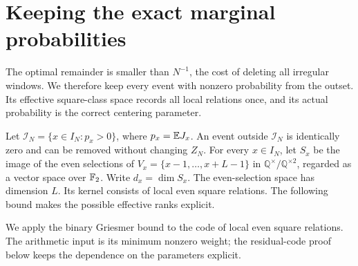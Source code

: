 \section{Keeping the exact marginal probabilities}
\label{p13:exact:section}

The optimal remainder is smaller than \(N^{-1}\), the cost of deleting
all irregular windows. We therefore keep every event with nonzero
probability from the outset. Its effective square-class space records
all local relations once, and its actual probability is the correct
centering parameter.

Let \(\mathcal I_N=\{x\in I_N:p_x>0\}\), where \(p_x=\mathbb E J_x\).
An event outside \(\mathcal I_N\) is identically zero and can be
removed without changing \(Z_N\). For every \(x\in I_N\), let
\(S_x\) be the image of the even selections of
\(V_x=\{x-1,\ldots,x+L-1\}\) in
\(\mathbb Q^\times/\mathbb Q^{\times2}\), regarded as a vector
space over \(\mathbb F_2\). Write \(d_x=\dim S_x\).
The even-selection space has dimension $L$. Its kernel consists of
local even square relations. The following bound makes the possible
effective ranks explicit.

We apply the binary Griesmer bound
\cite[Section~2, equation~(2.10)]{griesmer1960} to the code of
local even square relations. The arithmetic input is its minimum
nonzero weight; the residual-code proof below keeps the dependence
on the parameters explicit.

